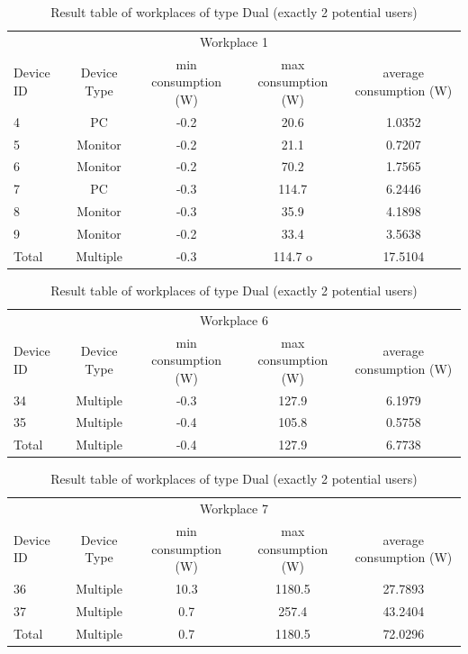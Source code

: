 \begin{table}[h]
	\centering
	\begin{tabular}{l|c|c|c|c}
		\multicolumn{5}{c}{Workplace 1} \\
		Device ID & Device Type & min consumption (W)& max consumption (W)& average consumption (W)\\
		4 & PC & -0.2 & 20.6 & 1.0352 \\
		5 & Monitor & -0.2 & 21.1 & 0.7207 \\
		6 & Monitor & -0.2 & 70.2 & 1.7565 \\
		7 & PC & -0.3 & 114.7 & 6.2446 \\
		8 & Monitor & -0.3 & 35.9 & 4.1898 \\
		9 & Monitor & -0.2 & 33.4 & 3.5638 \\
		\hline
		Total & Multiple & -0.3 & 114.7 o& 17.5104
	\end{tabular}
	\begin{tabular}{l|c|c|c|c}
		\multicolumn{5}{c}{Workplace 6} \\
		Device ID & Device Type & min consumption (W)& max consumption (W)& average consumption (W)\\
		34 & Multiple & -0.3 & 127.9 & 6.1979 \\
		35 & Multiple & -0.4 & 105.8 & 0.5758 \\
		\hline
		Total & Multiple & -0.4 & 127.9 & 6.7738
	\end{tabular}
	\begin{tabular}{l|c|c|c|c}
		\multicolumn{5}{c}{Workplace 7} \\
		Device ID & Device Type & min consumption (W)& max consumption (W)& average consumption (W)\\
		36 & Multiple & 10.3 & 1180.5 & 27.7893 \\
		37 & Multiple & 0.7 & 257.4 & 43.2404 \\
		\hline
		Total & Multiple & 0.7 & 1180.5 & 72.0296
	\end{tabular}
	\caption{Result table of workplaces of type Dual (exactly 2 potential users)}
	\label{tab:dual_workplace}
\end{table}
